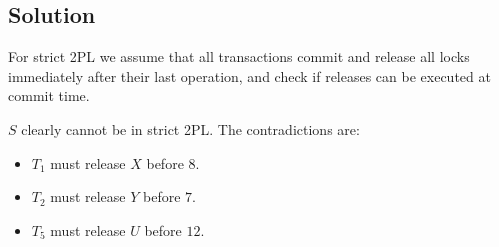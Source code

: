 \documentclass[12pt, a4paper]{report}
\begin{document}
    \subsection*{Solution}
        For strict 2PL we assume that all transactions commit and release all locks immediately after their last operation, and check if releases can be executed at commit time.
        \begin{table}[H]
            \centering
        \end{table}
        $S$ clearly cannot be in strict 2PL. The contradictions are:
        \begin{itemize}
            \item $T_1$ must release $X$ before $8$. 
            \item $T_2$ must release $Y$ before $7$.
            \item $T_5$ must release $U$ before $12$.
        \end{itemize}
\end{document}
